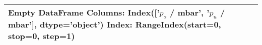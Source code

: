 \begin{tabular}{lll}
\toprule
Empty DataFrame
Columns: Index(['$p_o$ / mbar', '$p_u$ / mbar'], dtype='object')
Index: RangeIndex(start=0, stop=0, step=1) \\
\bottomrule
\end{tabular}
